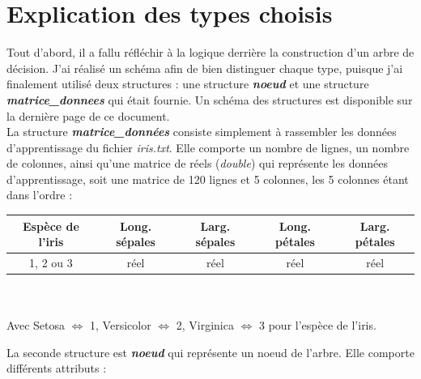 \chapter*{\textcolor{carmillon}{Explication des types choisis}}
Tout d'abord, il a fallu réfléchir à la logique derrière la construction d'un arbre de décision. J'ai réalisé un schéma afin de bien distinguer chaque type, puisque j'ai finalement utilisé deux structures : une structure \textbf{\textit{noeud}} et une structure \textbf{\textit{matrice\_donnees}} qui était fournie. Un schéma des structures est disponible sur la dernière page de ce document.\\

\noindent
La structure \textbf{\textit{matrice\_données}} consiste simplement à rassembler les données d'apprentissage du fichier \textit{iris.txt}. Elle comporte un nombre de lignes, un nombre de colonnes, ainsi qu'une matrice de réels (\textit{double}) qui représente les données d'apprentissage, soit une matrice de 120 lignes et 5 colonnes, les 5 colonnes étant dans l'ordre :\\

\begin{tabular}{|c|c|c|c|c|} 
	\hline
	Espèce de l'iris & Long. sépales & Larg. sépales & Long. pétales & Larg. pétales\\
	\hline
	1, 2 ou 3 & réel & réel & réel & réel\\
	\hline
\end{tabular}\\\\
Avec Setosa $\Leftrightarrow$ 1, Versicolor $\Leftrightarrow$ 2, Virginica $\Leftrightarrow$ 3 pour l'espèce de l'iris.

\noindent
La seconde structure est \textbf{\textit{noeud}} qui représente un noeud de l'arbre. Elle comporte différents attributs :\\

